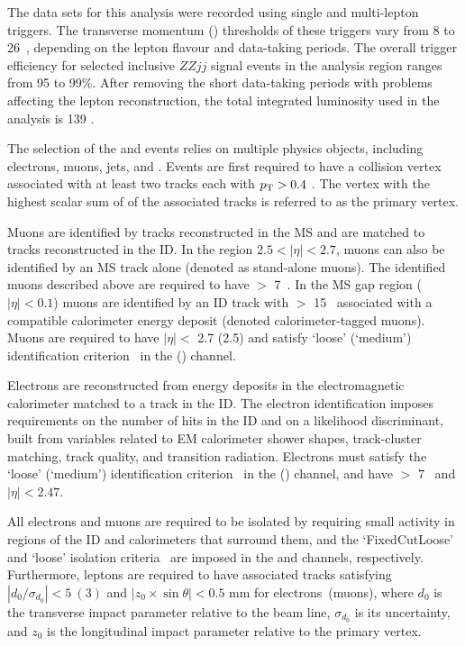 The data sets for this analysis were recorded using single and multi-lepton triggers.
The transverse momentum (\pT) thresholds of these triggers vary from 8 to 26~\GeV{},
depending on the lepton flavour and data-taking periods.
The overall trigger efficiency for selected inclusive $ZZjj$ signal events in the analysis region ranges from 95 to 99\%{}.
After removing the short data-taking periods with problems affecting the lepton reconstruction,
the total integrated luminosity used in the analysis is 139 \ifb.

The selection of the \lllljj and \llvvjj events relies on multiple physics objects, including electrons, muons, jets, and \met.
Events are first required to have a collision vertex associated with at least two tracks each with $p_{\text{T}}>0.4$ \GeV.
The vertex with the highest scalar sum of \pt{} of the associated tracks is referred to as the primary vertex.

Muons are identified by tracks reconstructed in the MS and are matched to tracks reconstructed in the ID. In the region $2.5<|\eta|<2.7$, muons can also be identified by an MS track alone (denoted as stand-alone muons).
The identified muons described above are required to have \pT{} $>$ 7~\GeV{}.
In the MS gap region ($|\eta|<0.1$) muons are identified by an ID track with \pT{} $>$ 15~\GeV{}
associated with a compatible calorimeter energy deposit (denoted calorimeter-tagged muons).
Muons are required to have $|\eta| <$ 2.7 (2.5) and satisfy `loose' (`medium') identification criterion~\cite{PERF-2015-10} in the \lllljj (\llvvjj) channel. 

Electrons are reconstructed from energy deposits in the electromagnetic calorimeter matched to a track in the ID.
The electron identification imposes requirements on the number of hits in the ID and on a likelihood discriminant,
built from variables related to EM calorimeter shower shapes, track-cluster matching, track quality, and transition radiation.
Electrons must satisfy the `loose' (`medium') identification criterion~\cite{Aaboud:2019ynx} in the \lllljj (\llvvjj) channel, and have \pT{} $>$ 7~\GeV{} and $|\eta| < 2.47$.

All electrons and muons are required to be isolated by requiring small activity in regions of the ID and calorimeters that surround them,
and the `FixedCutLoose' and `loose' isolation criteria~\cite{PERF-2015-10,Aaboud:2019ynx} are imposed in the \lllljj and \llvvjj channels, respectively. Furthermore, leptons are required to have associated tracks satisfying $|d_0/\sigma_{d_0}|<5~(3)$ and $|z_0\times\sin\theta|<0.5$ mm for electrons~(muons), where $d_0$ is the transverse impact parameter relative to the beam line, $\sigma_{d_0}$ is its uncertainty, and $z_0$ is the longitudinal impact parameter relative to the primary vertex.


